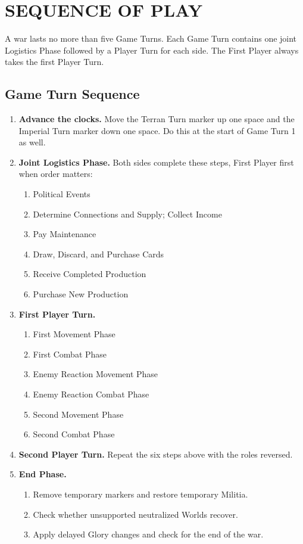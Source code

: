 \section{SEQUENCE OF PLAY}

A war lasts no more than five Game Turns. Each Game Turn contains one joint
Logistics Phase followed by a Player Turn for each side. The First Player
always takes the first Player Turn.

\subsection{Game Turn Sequence}

\begin{enumerate}[label=\Alph*.]
  \item \textbf{Advance the clocks.} Move the Terran Turn marker up one space
    and the Imperial Turn marker down one space. Do this at the start of Game
    Turn 1 as well.
  \item \textbf{Joint Logistics Phase.} Both sides complete these steps, First
    Player first when order matters:
    \begin{enumerate}[label=\arabic*.]
      \item Political Events
      \item Determine Connections and Supply; Collect Income
      \item Pay Maintenance
      \item Draw, Discard, and Purchase Cards
      \item Receive Completed Production
      \item Purchase New Production
    \end{enumerate}
  \item \textbf{First Player Turn.}
    \begin{enumerate}[label=\arabic*.]
      \item First Movement Phase
      \item First Combat Phase
      \item Enemy Reaction Movement Phase
      \item Enemy Reaction Combat Phase
      \item Second Movement Phase
      \item Second Combat Phase
    \end{enumerate}
  \item \textbf{Second Player Turn.} Repeat the six steps above with the roles
    reversed.
  \item \textbf{End Phase.}
    \begin{enumerate}[label=\arabic*.]
      \item Remove temporary markers and restore temporary Militia.
      \item Check whether unsupported neutralized Worlds recover.
      \item Apply delayed Glory changes and check for the end of the war.
    \end{enumerate}
\end{enumerate}

